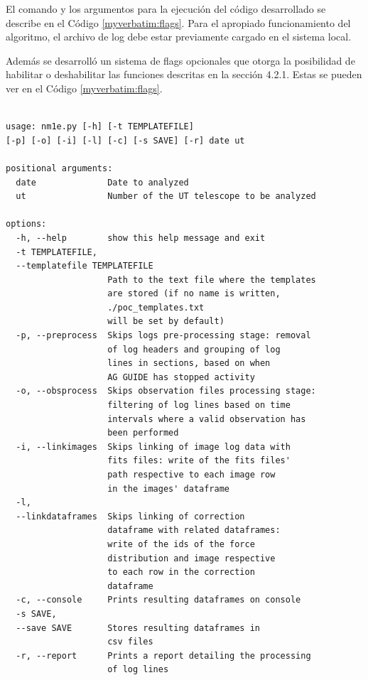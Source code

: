 El comando y los argumentos para la ejecución del código desarrollado se describe en el Código \ref{myverbatim:flags}. Para el apropiado funcionamiento del algoritmo, el archivo de log debe estar previamente cargado en el sistema local.

Además se desarrolló un sistema de flags opcionales que otorga la posibilidad de habilitar o deshabilitar las funciones descritas en la sección 4.2.1. Estas se pueden ver en el Código \ref{myverbatim:flags}.

  \begin{listing}[!ht]
    \caption{\label{myverbatim:flags} Ejemplos de fuerzas aplicadas}
    \begin{verbatim}
    
usage: nm1e.py [-h] [-t TEMPLATEFILE] 
[-p] [-o] [-i] [-l] [-c] [-s SAVE] [-r] date ut

positional arguments:
  date              Date to analyzed
  ut                Number of the UT telescope to be analyzed

options:
  -h, --help        show this help message and exit
  -t TEMPLATEFILE, 
  --templatefile TEMPLATEFILE
                    Path to the text file where the templates
                    are stored (if no name is written, 
                    ./poc_templates.txt
                    will be set by default)
  -p, --preprocess  Skips logs pre-processing stage: removal
                    of log headers and grouping of log 
                    lines in sections, based on when 
                    AG GUIDE has stopped activity
  -o, --obsprocess  Skips observation files processing stage: 
                    filtering of log lines based on time 
                    intervals where a valid observation has 
                    been performed
  -i, --linkimages  Skips linking of image log data with 
                    fits files: write of the fits files' 
                    path respective to each image row 
                    in the images' dataframe
  -l, 
  --linkdataframes  Skips linking of correction 
                    dataframe with related dataframes: 
                    write of the ids of the force 
                    distribution and image respective 
                    to each row in the correction 
                    dataframe
  -c, --console     Prints resulting dataframes on console
  -s SAVE, 
  --save SAVE       Stores resulting dataframes in 
                    csv files
  -r, --report      Prints a report detailing the processing 
                    of log lines
        \end{verbatim}
    \end{listing}


